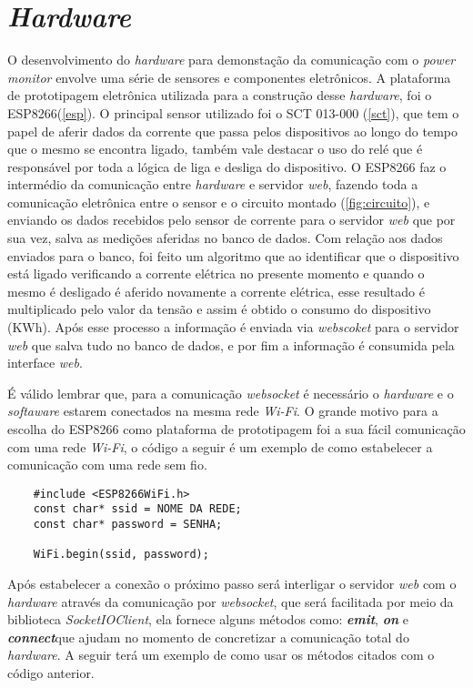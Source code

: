 \section[\textit{Hardware}]{\textit{Hardware}}\label{hard-sec}
O desenvolvimento do \textit{hardware} para demonstação da comunicação com o \textit{power monitor} envolve uma série de sensores e componentes
eletrônicos. A plataforma de prototipagem eletrônica utilizada para a construção desse \textit{hardware}, foi o ESP8266(\autoref{esp}). O principal sensor
utilizado foi o SCT 013-000 (\autoref{sct}), que tem o papel de aferir dados da corrente que passa pelos dispositivos ao longo do tempo que o mesmo se encontra
ligado, também vale destacar o uso do relé que é responsável por toda a lógica de liga e desliga do dispositivo. O ESP8266 faz o intermédio da comunicação entre 
\textit{hardware} e servidor \textit{web}, fazendo toda a comunicação eletrônica entre o sensor e o circuito montado (\autoref{fig:circuito}), e enviando os dados
recebidos pelo sensor de corrente para o servidor \textit{web} que por sua vez, salva as medições aferidas no banco de dados. Com relação aos dados enviados 
para o banco, foi feito um algoritmo que ao identificar que o dispositivo está ligado verificando a corrente elétrica no presente momento e quando o mesmo é desligado 
é aferido novamente a corrente elétrica, esse resultado é multiplicado pelo valor da tensão
e assim é obtido o consumo do dispositivo (KWh). Após esse processo a informação é enviada via \textit{webscoket} 
para o servidor \textit{web} que salva tudo no banco de dados, e por fim a informação é consumida pela interface \textit{web}.

É válido lembrar que, para a comunicação \textit{websocket} é necessário o \textit{hardware} e o \textit{softaware} estarem conectados
na mesma rede \textit{Wi-Fi}. O grande motivo para a escolha do ESP8266 como plataforma de prototipagem foi a sua fácil comunicação com uma rede
\textit{Wi-Fi}, o código a seguir é um exemplo de como estabelecer a comunicação com uma rede sem fio.

\newpage

\begin{lstlisting}
	#include <ESP8266WiFi.h>
	const char* ssid = NOME DA REDE;
	const char* password = SENHA;
	
	WiFi.begin(ssid, password);
\end{lstlisting}

Após estabelecer a conexão o próximo passo será interligar o servidor \textit{web} com o \textit{hardware} através da comunicação por \textit{websocket},
que será facilitada por meio da biblioteca \textit{SocketIOClient}, ela fornece alguns métodos como: \textit{\textbf{emit}}\protect\footnotemark, \textit{\textbf{on}}\protect\footnotemark 
e \textit{\textbf{connect}}\protect\footnotemark  que ajudam no momento de concretizar a comunicação total do \textit{hardware}. A seguir terá um
exemplo de como usar os métodos citados com o código anterior.


